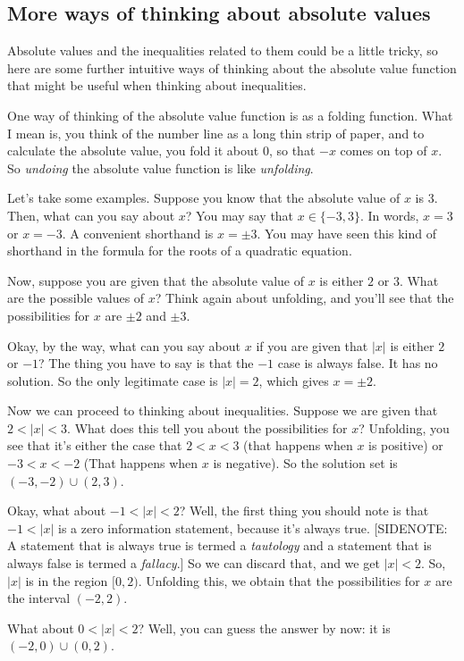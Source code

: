 \documentclass{amsart}
\begin{document}
\subsection{More ways of thinking about absolute values}

Absolute values and the inequalities related to them could be a little
tricky, so here are some further intuitive ways of thinking about the
absolute value function that might be useful when thinking about
inequalities.

One way of thinking of the absolute value function is as a folding
function. What I mean is, you think of the number line as a long thin
strip of paper, and to calculate the absolute value, you fold it about
$0$, so that $-x$ comes on top of $x$. So {\em undoing} the absolute
value function is like {\em unfolding}.

Let's take some examples. Suppose you know that the absolute value of
$x$ is $3$. Then, what can you say about $x$? You may say that $x \in
\{ -3,3 \}$. In words, $x = 3$ or $x = -3$. A convenient shorthand is
$x = \pm 3$. You may have seen this kind of shorthand in the formula
for the roots of a quadratic equation.

Now, suppose you are given that the absolute value of $x$ is either
$2$ or $3$. What are the possible values of $x$? Think again about
unfolding, and you'll see that the possibilities for $x$ are $\pm 2$
and $\pm 3$.

Okay, by the way, what can you say about $x$ if you are given that
$|x|$ is either $2$ or $-1$? The thing you have to say is that the
$-1$ case is always false. It has no solution. So the only legitimate
case is $|x| = 2$, which gives $x = \pm 2$.

Now we can proceed to thinking about inequalities. Suppose we are
given that $2 < |x| < 3$. What does this tell you about the
possibilities for $x$? Unfolding, you see that it's either the case
that $2 < x < 3$ (that happens when $x$ is positive) or $-3 < x < -2$
(That happens when $x$ is negative). So the solution set is $(-3,-2)
\cup (2,3)$.

Okay, what about $-1 < |x| < 2$? Well, the first thing you should note
is that $-1 < |x|$ is a zero information statement, because it's
always true. [SIDENOTE: A statement that is always true is termed a
{\em tautology} and a statement that is always false is termed a {\em
fallacy}.] So we can discard that, and we get $|x| < 2$. So, $|x|$ is
in the region $[0,2)$. Unfolding this, we obtain that the
possibilities for $x$ are the interval $(-2,2)$.

What about $0 < |x| < 2$? Well, you can guess the answer by now:
it is $(-2,0) \cup (0,2)$.
\end{document}

